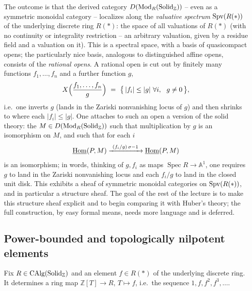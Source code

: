 \begin{remark}
\label{rmk:7:valuative-spectrum}
The outcome is that the derived category
$D(\mathrm{Mod}_{R}(\mathrm{Solid}_{\mathbb{Z}}))$ -- even as a symmetric monoidal
category -- localizes along the \emph{valuative spectrum}
$\operatorname{Spv}(R(\ast))$ of the underlying discrete ring $R(\ast)$: the space of all
valuations of $R(\ast)$ (with no continuity or integrality restriction -- an
arbitrary valuation, given by a residue field and a valuation on it). This is a
spectral space, with a basis of quasicompact opens; the particularly nice
basis, analogous to distinguished affine opens, consists of the
\emph{rational opens}. A rational open is cut out by finitely many functions
$f_1,\dots,f_n$ and a further function $g$,
\begin{equation}
\label{eq:7:rational-open}
X\Bigl(\frac{f_1,\dots,f_n}{g}\Bigr)\ =\ \bigl\{\,|f_i|\le|g|\ \forall i,\
\ g\neq0\,\bigr\},
\end{equation}
i.e.\ one inverts $g$ (lands in the Zariski nonvanishing locus of $g$) and
then shrinks to where each $|f_i|\le|g|$. One attaches to such an open a
version of the solid theory: the $M\in D(\mathrm{Mod}_{R}(\mathrm{Solid}_{\mathbb{Z}}))$
such that multiplication by $g$ is an isomorphism on $M$, and such that for
each $i$
\begin{equation*}
\iHom(P,M)\xrightarrow{\ (f_i/g)\,\sigma-1\ }\iHom(P,M)
\end{equation*}
is an isomorphism; in words, thinking of $g,f_i$ as maps
$\operatorname{Spec}R\to\mathbb{A}^1$, one requires $g$ to land in the Zariski
nonvanishing locus and each $f_i/g$ to land in the closed unit disk. This
exhibits a sheaf of symmetric monoidal categories on $\operatorname{Spv}(R(\ast))$, and in
particular a structure sheaf. The goal of the rest of the lecture is to make
this structure sheaf explicit and to begin comparing it with Huber's theory;
the full construction, by easy formal means, needs more language and is
deferred.
\end{remark}

\subsection{Power-bounded and topologically nilpotent elements}

Fix $R\in\operatorname{CAlg}(\mathrm{Solid}_{\mathbb{Z}})$ and an element $f\in R(\ast)$ of the
underlying discrete ring. It determines a ring map $\mathbb{Z}[T]\to R$,
$T\mapsto f$, i.e.\ the sequence $1,f,f^2,f^3,\dots$.

